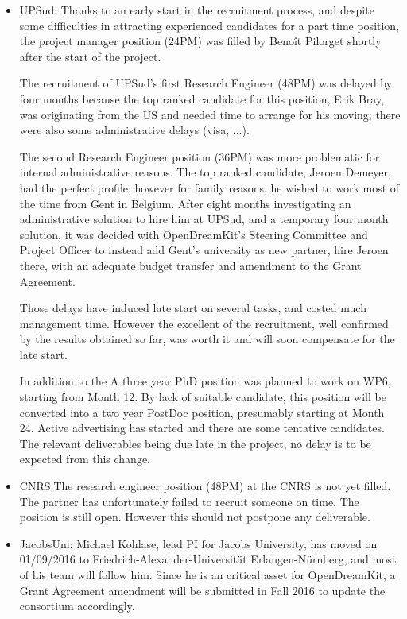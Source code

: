 \documentclass{deliverablereport}
\begin{document}
\begin{itemize}
\item{UPSud:}
  Thanks to an early start in the recruitment process, and despite
  some difficulties in attracting experienced candidates for a part
  time position, the project manager position (24PM) was filled by
  Benoît Pilorget shortly after the start of the project.

  The recruitment of UPSud's first Research Engineer (48PM) was
  delayed by four months because the top ranked candidate for this
  position, Erik Bray, was originating from the US and needed time to
  arrange for his moving; there were also some administrative delays
  (visa, ...).

  The second Research Engineer position (36PM) was more problematic
  for internal administrative reasons. The top ranked candidate,
  Jeroen Demeyer, had the perfect profile; however for family reasons,
  he wished to work most of the time from Gent in Belgium. After eight
  months investigating an administrative solution to hire him at
  UPSud, and a temporary four month solution, it was decided with
  OpenDreamKit's Steering Committee and Project Officer to instead add
  Gent's university as new partner, hire Jeroen there, with an
  adequate budget transfer and amendment to the Grant Agreement.

  Those delays have induced late start on several tasks, and costed
  much management time. However the excellent of the recruitment, well
  confirmed by the results obtained so far, was worth it and will soon
  compensate for the late start.

  In addition to the A three year PhD position was planned to work on WP6, starting from
  Month 12. By lack of suitable candidate, this position will be
  converted into a two year PostDoc position, presumably starting at
  Month 24. Active advertising has started and there are some
  tentative candidates. The relevant deliverables being due late in
  the project, no delay is to be expected from this change.

\item{CNRS:}The research engineer position (48PM) at the CNRS is not yet filled. The partner has unfortunately failed to recruit someone on time. The position is still open. However this should not postpone any deliverable.

\item{JacobsUni:} Michael Kohlase, lead PI for Jacobs University, has
  moved on 01/09/2016 to Friedrich-Alexander-Universität
  Erlangen-Nürnberg, and most of his team will follow him. Since he is
  an critical asset for OpenDreamKit, a Grant Agreement amendment will
  be submitted in Fall 2016 to update the consortium accordingly.


\end{itemize}
\end{document}
